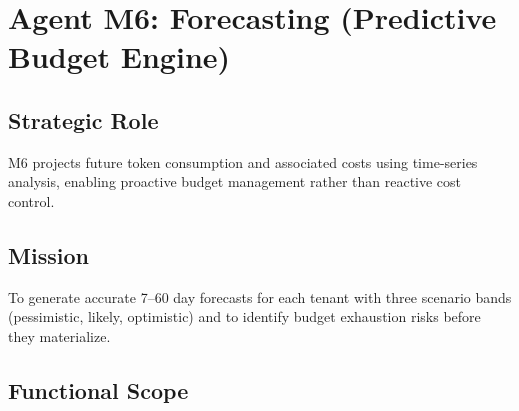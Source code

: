 \documentclass[12pt,a4paper,twoside]{report}
\begin{document}
\section{Agent M6: Forecasting (Predictive Budget Engine)}

\subsection{Strategic Role}
M6 projects future token consumption and associated costs using time-series analysis, enabling proactive budget management rather than reactive cost control.

\subsection{Mission}
To generate accurate 7--60 day forecasts for each tenant with three scenario bands (pessimistic, likely, optimistic) and to identify budget exhaustion risks before they materialize.

\subsection{Functional Scope}
\end{document}

